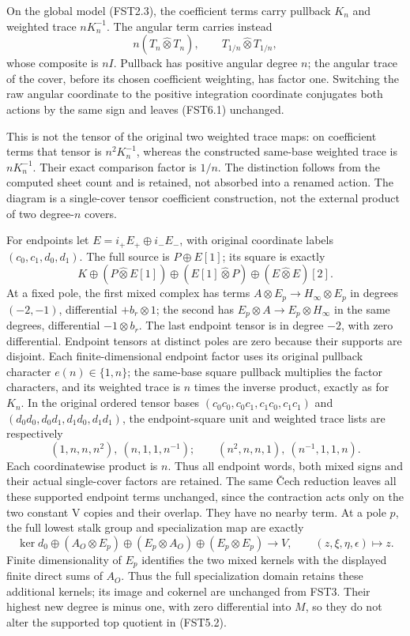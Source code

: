 On the global model (FST2.3), the coefficient terms carry pullback
\(K_n\) and weighted trace \(nK_n^{-1}\). The angular term carries
instead \[
n(T_n\widehat\otimes T_n),\qquad
T_{1/n}\widehat\otimes T_{1/n},
\tag{FST6.1}
\] whose composite is \(nI\). Pullback has positive angular degree
\(n\); the angular trace of the cover, before its chosen coefficient
weighting, has factor one. Switching the raw angular coordinate to the
positive integration coordinate conjugates both actions by the same sign
and leaves (FST6.1) unchanged.

This is not the tensor of the original two weighted trace maps: on
coefficient terms that tensor is \(n^2K_n^{-1}\), whereas the
constructed same-base weighted trace is \(nK_n^{-1}\). Their exact
comparison factor is \(1/n\). The distinction follows from the computed
sheet count and is retained, not absorbed into a renamed action. The
diagram is a single-cover tensor coefficient construction, not the
external product of two degree-\(n\) covers.

For endpoints let \(E=i_+E_+\oplus i_-E_-\), with original coordinate
labels \((c_0,c_1,d_0,d_1)\). The full source is \(P\oplus E[1]\); its
square is exactly \[
K\oplus(P\widehat\otimes E[1])\oplus(E[1]\widehat\otimes P)
\oplus(E\widehat\otimes E)[2].
\tag{FST6.2}
\] At a fixed pole, the first mixed complex has terms
\(A\otimes E_p\to H_\infty\otimes E_p\) in degrees \((-2,-1)\),
differential \(+b_r\otimes1\); the second has
\(E_p\otimes A\to E_p\otimes H_\infty\) in the same degrees,
differential \(-1\otimes b_r\). The last endpoint tensor is in degree
\(-2\), with zero differential. Endpoint tensors at distinct poles are
zero because their supports are disjoint. Each finite-dimensional
endpoint factor uses its original pullback character \(e(n)\in\{1,n\}\);
the same-base square pullback multiplies the factor characters, and its
weighted trace is \(n\) times the inverse product, exactly as for
\(K_n\). In the original ordered tensor bases
\((c_0c_0,c_0c_1,c_1c_0,c_1c_1)\) and \((d_0d_0,d_0d_1,d_1d_0,d_1d_1)\),
the endpoint-square unit and weighted trace lists are respectively \[
(1,n,n,n^2),\ (n,1,1,n^{-1});\qquad
(n^2,n,n,1),\ (n^{-1},1,1,n).
\] Each coordinatewise product is \(n\). Thus all endpoint words, both
mixed signs and their actual single-cover factors are retained. The same
Čech reduction leaves all these supported endpoint terms unchanged,
since the contraction acts only on the two constant V copies and their
overlap. They have no nearby term. At a pole \(p\), the full lowest
stalk group and specialization map are exactly \[
\ker d_0\oplus(A_O\otimes E_p)\oplus(E_p\otimes A_O)\oplus(E_p\otimes E_p)
\longrightarrow V,\qquad(z,\xi,\eta,\epsilon)\longmapsto z.
\tag{FST6.3}
\] Finite dimensionality of \(E_p\) identifies the two mixed kernels
with the displayed finite direct sums of \(A_O\). Thus the full
specialization domain retains these additional kernels; its image and
cokernel are unchanged from FST3. Their highest new degree is minus one,
with zero differential into \(M\), so they do not alter the supported
top quotient in (FST5.2).

